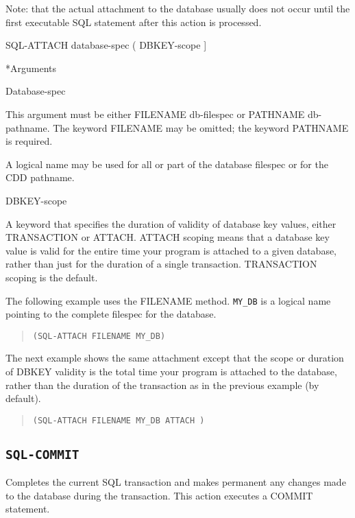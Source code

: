 {{Note: that the actual attachment to the database usually does
not occur until the first executable SQL statement after this
action is processed.



\Format

SQL-ATTACH database-spec ( DBKEY-scope ]



*Arguments

Database-spec

This argument must be either FILENAME db-filespec or PATHNAME
db-pathname. The keyword FILENAME may be omitted; the keyword
PATHNAME is required.

A logical name may be used for all or part of the database
filespec or for the CDD pathname.

DBKEY-scope

A keyword that specifies the duration of validity of database
key values, either TRANSACTION or ATTACH. ATTACH scoping
means that a database key value is valid for the entire time
your program is attached to a given database, rather than
just for the duration of a single transaction. TRANSACTION
scoping is the default.



\Example

The following example uses the FILENAME method. \verb|MY_DB| is a
logical name pointing to the complete filespec for the
database.
\begin{quote}
\begin{verbatim}
(SQL-ATTACH FILENAME MY_DB)
\end{verbatim}
\end{quote}

The next example shows the same attachment except that the
scope or duration of DBKEY validity is the total time your
program is attached to the database, rather than the duration
of the transaction as in the previous example (by default).
\begin{quote}
\begin{verbatim}
(SQL-ATTACH FILENAME MY_DB ATTACH )
\end{verbatim}
\end{quote}

\subsection{\tt{SQL-COMMIT}}

Completes the current SQL transaction and makes permanent any
changes made to the database during the transaction. This
action executes a COMMIT statement.



}}
